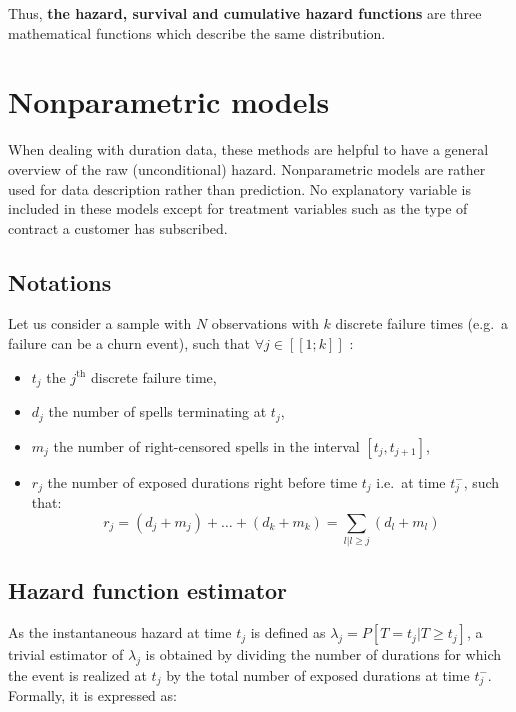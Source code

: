 \documentclass[
]{book}
\providecommand{\tightlist}{%
  \setlength{\itemsep}{0pt}\setlength{\parskip}{0pt}}
\begin{document}
Thus, \textbf{the hazard, survival and cumulative hazard functions} are three mathematical functions which describe the same distribution.

\hypertarget{nonparam}{%
\section{Nonparametric models}\label{nonparam}}

When dealing with duration data, these methods are helpful to have a general overview of the raw (unconditional) hazard. Nonparametric models are rather used for data description rather than prediction. No explanatory variable is included in these models except for treatment variables such as the type of contract a customer has subscribed.

\hypertarget{notations}{%
\subsection{Notations}\label{notations}}

Let us consider a sample with \(N\) observations with \(k\) discrete failure times (e.g.~a failure can be a churn event), such that \(\forall j \in [\![1; k]\!]\) :

\begin{itemize}
\tightlist
\item
  \(t_j\) the \(j^{\text{th}}\) discrete failure time,
\item
  \(d_j\) the number of spells terminating at \(t_j\),
\item
  \(m_j\) the number of right-censored spells in the interval \([t_j, t_{j+1}]\),
\item
  \(r_j\) the number of exposed durations right before time \(t_j\) i.e.~at time \(t_j^{-}\), such that:
  \begin{equation}
  r_j = (d_j + m_j) + \dots + (d_k + m_k) = \sum_{l|l \geq j} (d_l + m_l)
  \label{eq:exposed}
  \end{equation}
\end{itemize}

\hypertarget{hazard-function-estimator}{%
\subsection{Hazard function estimator}\label{hazard-function-estimator}}

As the instantaneous hazard at time \(t_j\) is defined as \(\lambda_j = P[T=t_j|T\geq t_j]\), a trivial estimator of \(\lambda_j\) is obtained by dividing the number of durations for which the event is realized at \(t_j\) by the total number of exposed durations at time \(t_j^{-}\). Formally, it is expressed as:
\end{document}
